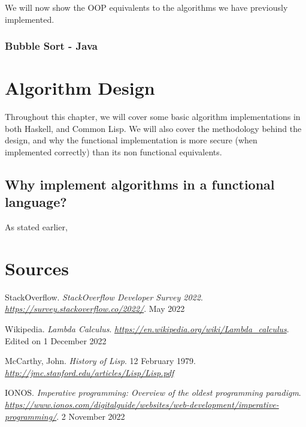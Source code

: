 \documentclass{report}
\newcommand{\csite}[5]{
  #2, #1. \textit{#3}. #4. \textit{\url{#5}} \newline
}
\newcommand{\link}[4]{
  #1. \textit{#2}. \textit{\url{#4}}. #3 \newline
}
\begin{document}
We will now show the OOP equivalents to the algorithms we have previously implemented.

\subsection{Bubble Sort - Java}

\chapter{Algorithm Design}
Throughout this chapter, we will cover some basic algorithm implementations in both Haskell, and Common Lisp. We will also cover the methodology behind the design, and why the functional implementation is more secure (when implemented correctly) than its non functional equivalents.
\section{Why implement algorithms in a functional language?}
As stated earlier,

\newpage
\chapter{Sources}
\link{StackOverflow}{StackOverflow Developer Survey 2022}{May 2022}{https://survey.stackoverflow.co/2022/}
\link{Wikipedia}{Lambda Calculus}{Edited on 1 December 2022}{https://en.wikipedia.org/wiki/Lambda_calculus}
\csite{John}{McCarthy}{History of Lisp}{12 February 1979}{http://jmc.stanford.edu/articles/Lisp/Lisp.pdf}
\link{IONOS}{Imperative programming: Overview of the oldest programming paradigm}{2 November 2022}{https://www.ionos.com/digitalguide/websites/web-development/imperative-programming/}
\end{document}
